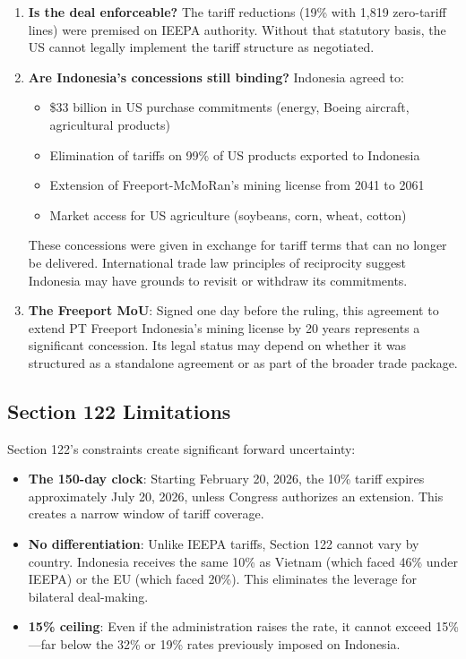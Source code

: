 \documentclass[12pt,a4paper]{article}
\begin{document}
\begin{enumerate}
    \item \textbf{Is the deal enforceable?} The tariff reductions (19\% with 1,819 zero-tariff lines) were premised on IEEPA authority. Without that statutory basis, the US cannot legally implement the tariff structure as negotiated.

    \item \textbf{Are Indonesia's concessions still binding?} Indonesia agreed to:
    \begin{itemize}
        \item \$33 billion in US purchase commitments (energy, Boeing aircraft, agricultural products)
        \item Elimination of tariffs on 99\% of US products exported to Indonesia
        \item Extension of Freeport-McMoRan's mining license from 2041 to 2061
        \item Market access for US agriculture (soybeans, corn, wheat, cotton)
    \end{itemize}
    These concessions were given in exchange for tariff terms that can no longer be delivered. International trade law principles of reciprocity suggest Indonesia may have grounds to revisit or withdraw its commitments.

    \item \textbf{The Freeport MoU}: Signed one day before the ruling, this agreement to extend PT Freeport Indonesia's mining license by 20 years represents a significant concession. Its legal status may depend on whether it was structured as a standalone agreement or as part of the broader trade package.
\end{enumerate}

\subsection{Section 122 Limitations}

Section 122's constraints create significant forward uncertainty:

\begin{itemize}
    \item \textbf{The 150-day clock}: Starting February 20, 2026, the 10\% tariff expires approximately July 20, 2026, unless Congress authorizes an extension. This creates a narrow window of tariff coverage.

    \item \textbf{No differentiation}: Unlike IEEPA tariffs, Section 122 cannot vary by country. Indonesia receives the same 10\% as Vietnam (which faced 46\% under IEEPA) or the EU (which faced 20\%). This eliminates the leverage for bilateral deal-making.

    \item \textbf{15\% ceiling}: Even if the administration raises the rate, it cannot exceed 15\%---far below the 32\% or 19\% rates previously imposed on Indonesia.
\end{itemize}
\end{document}
